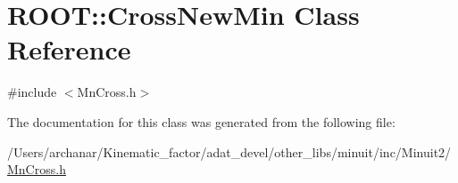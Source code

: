 \hypertarget{classROOT_1_1Minuit2_1_1MnCross_1_1CrossNewMin}{}\section{R\+O\+OT\+:\+:Cross\+New\+Min Class Reference}
\label{classROOT_1_1Minuit2_1_1MnCross_1_1CrossNewMin}


{\ttfamily \#include $<$Mn\+Cross.\+h$>$}



The documentation for this class was generated from the following file\+:\begin{DoxyCompactItemize}
\item 
/\+Users/archanar/\+Kinematic\+\_\+factor/adat\+\_\+devel/other\+\_\+libs/minuit/inc/\+Minuit2/\mbox{\hyperlink{other__libs_2minuit_2inc_2Minuit2_2MnCross_8h}{Mn\+Cross.\+h}}\end{DoxyCompactItemize}
